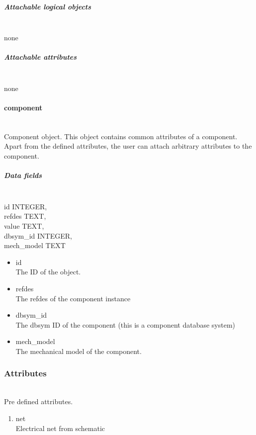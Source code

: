 \documentclass[12pt]{article}
\begin{document}
\subparagraph{Attachable logical objects}

\mbox{}\\

none

\subparagraph{Attachable attributes}

\mbox{}\\

none

\paragraph{component}\label{component}

\mbox{}\\

Component object. This object contains common attributes of a component.
Apart from the defined attributes, the user can attach arbitrary attributes to
the component.

\subparagraph{Data fields}

\mbox{}\\

id INTEGER,\\
refdes TEXT,\\
value TEXT,\\
dbsym\_id INTEGER,\\
mech\_model TEXT

\begin{itemize}
\item id\\
The ID of the object.
\item refdes\\
The refdes of the component instance
\item dbsym\_id\\
The dbsym ID of the component (this is a component database system)
\item mech\_model\\
The mechanical model of the component.
\end{itemize}


\subsubsection{Attributes}\label{attributes}

\mbox{}\\

Pre defined attributes.

\begin{enumerate}
\item
  net\\ Electrical net from schematic
\end{enumerate}
\end{document}
